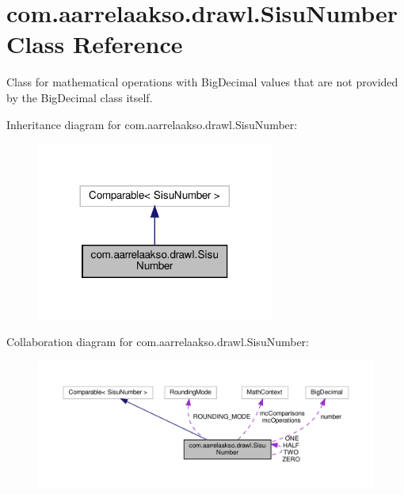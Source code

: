 \hypertarget{classcom_1_1aarrelaakso_1_1drawl_1_1_sisu_number}{}\section{com.\+aarrelaakso.\+drawl.\+Sisu\+Number Class Reference}
\label{classcom_1_1aarrelaakso_1_1drawl_1_1_sisu_number}


Class for mathematical operations with Big\+Decimal values that are not provided by the Big\+Decimal class itself.  




Inheritance diagram for com.\+aarrelaakso.\+drawl.\+Sisu\+Number\+:\nopagebreak
\begin{figure}[H]
\begin{center}
\leavevmode
\includegraphics[width=221pt]{df/d65/classcom_1_1aarrelaakso_1_1drawl_1_1_sisu_number__inherit__graph}
\end{center}
\end{figure}


Collaboration diagram for com.\+aarrelaakso.\+drawl.\+Sisu\+Number\+:\nopagebreak
\begin{figure}[H]
\begin{center}
\leavevmode
\includegraphics[width=350pt]{df/d10/classcom_1_1aarrelaakso_1_1drawl_1_1_sisu_number__coll__graph}
\end{center}
\end{figure}
